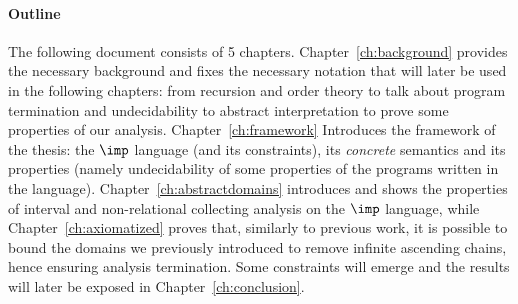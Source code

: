 \paragraph*{Outline}
The following document consists of 5
chapters. Chapter~\ref{ch:background} provides the necessary
background and fixes the necessary notation that will later be used in
the following chapters: from recursion and order theory to talk about
program termination and undecidability to abstract interpretation to
prove some properties of our analysis. Chapter~\ref{ch:framework}
Introduces the framework of the thesis: the \(\imp\) language (and its
constraints), its \emph{concrete} semantics and its properties (namely
undecidability of some properties of the programs written in the
language). Chapter~\ref{ch:abstractdomains} introduces and shows the
properties of interval and non-relational collecting analysis on the
\(\imp\) language, while Chapter~\ref{ch:axiomatized} proves that,
similarly to previous work, it is possible to bound the domains we
previously introduced to remove infinite ascending chains, hence
ensuring analysis termination. Some constraints will emerge and the
results will later be exposed in Chapter~\ref{ch:conclusion}.
